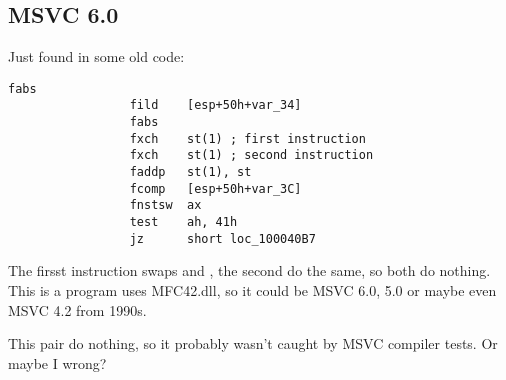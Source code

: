 \subsection{MSVC 6.0}

Just found in some old code:

\begin{lstlisting}[style=customasmx86]
                 fabs
                 fild    [esp+50h+var_34]
                 fabs
                 fxch    st(1) ; first instruction
                 fxch    st(1) ; second instruction
                 faddp   st(1), st
                 fcomp   [esp+50h+var_3C]
                 fnstsw  ax
                 test    ah, 41h
                 jz      short loc_100040B7
\end{lstlisting}

The firsst  instruction swaps  and , the second do the same, so both do nothing.
This is a program uses MFC42.dll, so it could be MSVC 6.0, 5.0 or maybe even MSVC 4.2 from 1990s.

This pair do nothing, so it probably wasn't caught by MSVC compiler tests.
Or maybe I wrong?

